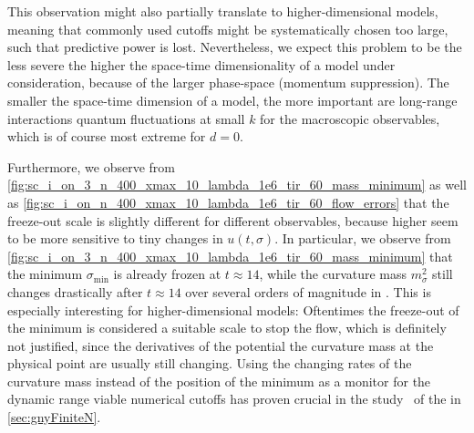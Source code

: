 This observation might also partially translate to higher-dimensional models, meaning that commonly used \ir{} cutoffs might be systematically chosen too large, such that predictive power is lost. Nevertheless, we expect this problem to be the less severe the higher the space-time dimensionality of a model under consideration, because of the larger phase-space (momentum suppression).
The smaller the space-time dimension of a model, the more important are long-range interactions \dash{} quantum fluctuations at small \rgscales{} $k$ \dash{} for the macroscopic observables, which is of course most extreme for $d = 0$.

Furthermore, we observe from \cref{fig:sc_i_on_3_n_400_xmax_10_lambda_1e6_tir_60_mass_minimum} as well as \cref{fig:sc_i_on_n_400_xmax_10_lambda_1e6_tir_60_flow_errors} that the freeze-out scale is slightly different for different observables, because higher \ipi{} \nptFunctions{} seem to be more sensitive to tiny changes in $u ( t, \sigma )$.
In particular, we observe from \cref{fig:sc_i_on_3_n_400_xmax_10_lambda_1e6_tir_60_mass_minimum} that the minimum $\sigma_\mathrm{min}$ is already frozen at $t \approx 14$, while the curvature mass $m_\sigma^2$ still changes drastically after $t \approx 14$ over several orders of magnitude in \rgscale{}.
This is especially interesting for higher-dimensional models: Oftentimes the freeze-out of the minimum is considered a suitable \ir{} scale to stop the \frg{} flow, which is definitely not justified, since the derivatives of the potential \dash{} the curvature mass \dash{} at the physical point are usually still changing.
Using the changing rates of the curvature mass instead of the position of the minimum as a monitor for the dynamic range \dash{} viable numerical \ir{} cutoffs \dash{} has proven crucial in the \frg{} study~\cite{Stoll:2021ori} of the \gnym{} in \cref{sec:gnyFiniteN}.

